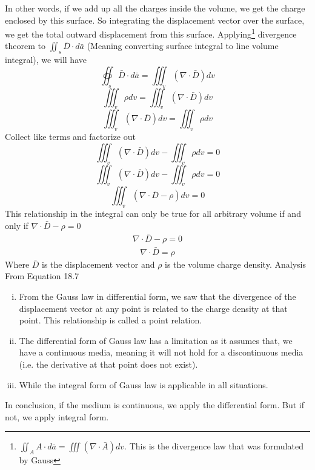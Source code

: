 In other words, if we add up all the charges inside the volume, we get the charge enclosed by this surface. So integrating the displacement vector over the surface, we get the total outward displacement from this surface. 
Applying\footnote{
$	\iint_A A\cdot d\bar{a} = \iiint (\nabla\cdot \bar{A})dv $. This is the divergence law that was formulated by Gauss
} divergence theorem to $\iint_s\bar{D}\cdot d\bar{a}$ (Meaning converting surface integral to line volume integral), we will have 
\begin{equation*}
\oiint_s\bar{D} \cdot d\bar{a} = \iiint_v(\nabla\cdot \bar{D})dv
\end{equation*}
\begin{equation*}
\iiint_v\rho dv = \iiint_v(\nabla\cdot \bar{D})dv
\end{equation*}
\begin{equation*}
\iiint_v(\nabla\cdot \bar{D})dv = \iiint_v\rho dv
\end{equation*}
Collect like terms and factorize out
\begin{equation*}
\iiint_v(\nabla\cdot \bar{D})dv - \iiint_v\rho dv = 0
\end{equation*}
\begin{equation*}
\iiint_v(\nabla\cdot \bar{D})dv - \iiint_v\rho dv = 0
\end{equation*}
\begin{equation*}
\iiint_v(\nabla\cdot \bar{D} - \rho)dv = 0
\end{equation*}
This relationship in the integral can only be
true for all arbitrary volume if and only if $\nabla\cdot\bar{D} - \rho = 0$
\begin{align*}
\nabla \cdot \bar{D} - \rho = 0
\end{align*}
\begin{align}
\boxed{\nabla \cdot \bar{D} = \rho}
\end{align}
Where $\bar{D}$ is the displacement vector and $\rho$ is the volume charge density.
Analysis From Equation 18.7
\begin{enumerate}[(i)]
\item From the Gauss law in differential form, we saw that the divergence of the displacement vector at any point is related to the charge density at that point. This relationship is called a point relation.
\item The differential form of Gauss law has a limitation as it assumes that, we have a continuous media, meaning it will not hold for a discontinuous media (i.e. the derivative at that point does not exist).
\item While the integral form of Gauss law is applicable in all situations.
\end{enumerate}
In conclusion, if the medium is continuous, we apply the differential form. But if not, we apply integral form.

